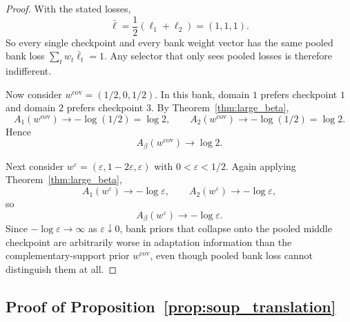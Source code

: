\documentclass{article}
\begin{document}
\begin{proof}
With the stated losses,
\begin{equation}
    \bar \ell
    =
    \frac{1}{2}(\ell_1+\ell_2)
    =
    (1,1,1).
\end{equation}
So every single checkpoint and every bank weight vector has the same pooled bank loss \(\sum_t w_t \bar\ell_t = 1\). Any selector that only sees pooled losses is therefore indifferent.

Now consider \(w^{\mathrm{cov}} = (1/2,0,1/2)\). In this bank, domain \(1\) prefers checkpoint \(1\) and domain \(2\) prefers checkpoint \(3\). By Theorem~\ref{thm:large_beta},
\begin{equation}
    A_1(w^{\mathrm{cov}})\to -\log(1/2)=\log 2,
    \qquad
    A_2(w^{\mathrm{cov}})\to -\log(1/2)=\log 2.
\end{equation}
Hence
\begin{equation}
    A_\beta(w^{\mathrm{cov}})\to \log 2.
\end{equation}

Next consider \(w^\varepsilon=(\varepsilon,1-2\varepsilon,\varepsilon)\) with \(0<\varepsilon<1/2\). Again applying Theorem~\ref{thm:large_beta},
\begin{equation}
    A_1(w^\varepsilon)\to -\log \varepsilon,
    \qquad
    A_2(w^\varepsilon)\to -\log \varepsilon,
\end{equation}
so
\begin{equation}
    A_\beta(w^\varepsilon)\to -\log \varepsilon.
\end{equation}
Since \(-\log \varepsilon \to \infty\) as \(\varepsilon \downarrow 0\), bank priors that collapse onto the pooled middle checkpoint are arbitrarily worse in adaptation information than the complementary-support prior \(w^{\mathrm{cov}}\), even though pooled bank loss cannot distinguish them at all. \qedhere
\end{proof}

\subsection{Proof of Proposition~\ref{prop:soup_translation}}
\end{document}
